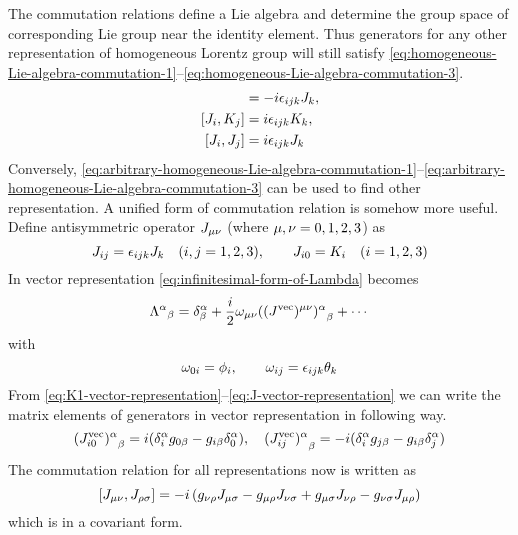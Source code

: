 The commutation relations define a Lie algebra and determine the group space of corresponding Lie group near the identity element. Thus generators for any other representation of homogeneous Lorentz group will still satisfy \eqref{eq:homogeneous-Lie-algebra-commutation-1}--\eqref{eq:homogeneous-Lie-algebra-commutation-3}.
\begin{align}
  [K_i,K_j] &= -i \e_{ijk} J_k, \label{eq:arbitrary-homogeneous-Lie-algebra-commutation-1} \\
  [J_i,K_j] &=  i \e_{ijk} K_k, \label{eq:arbitrary-homogeneous-Lie-algebra-commutation-2} \\
  [J_i,J_j] &=  i \e_{ijk} J_k  \label{eq:arbitrary-homogeneous-Lie-algebra-commutation-3}
\end{align}
Conversely, \eqref{eq:arbitrary-homogeneous-Lie-algebra-commutation-1}--\eqref{eq:arbitrary-homogeneous-Lie-algebra-commutation-3} can be used to find other representation. A unified form of commutation relation is somehow more useful. Define antisymmetric operator $J_{\mu\nu}$ (where $\mu,\nu = 0,1,2,3$) as
\begin{equation} \label{eq:redefine-Lorentz-generator-operators}
  J_{ij} = \epsilon_{ijk}J_k \quad (i,j = 1,2,3), \qquad
  J_{i0} = K_i \quad (i = 1,2,3)
\end{equation}
In vector representation
\eqref{eq:infinitesimal-form-of-Lambda}
becomes 
\begin{equation}\label{expansion of vector representation}
{\Lambda^{\alpha}}_{\beta} = \delta^{\alpha}_{\beta}+ \frac{i}{2}\omega_{\mu\nu}{((J^{\text{vec}})^{\mu\nu})^{\alpha}}_{\beta}+\cdots
\end{equation}
with 
\begin{equation}\label{redefinition of the parameters}
\omega_{0i}=\phi_i, \qquad \omega_{ij}=\epsilon_{ijk}\theta_k
\end{equation}
From \eqref{eq:K1-vector-representation}--\eqref{eq:J-vector-representation}
we can write the matrix elements of generators in vector representation in following way.
\begin{equation}\label{explicit form of vector representation}
{(J^{\text{vec}}_{i0})^{\alpha}}_{\beta}=
i(\delta^{\alpha}_i g_{0\beta}-g_{i\beta}\delta^{\alpha}_0),\quad
{(J^{\text{vec}}_{ij})^{\alpha}}_{\beta}=
-i(\delta^{\alpha}_i g_{j\beta}-g_{i\beta}\delta^{\alpha}_j)
\end{equation} 
The commutation relation for all representations now is written as
\begin{equation} \label{eq:Lorentz-operator-commutation-covariant-form}
  \comm{J_{\mu\nu}}{J_{\rh\s}} =
  -i \, (  g_{\n\rh}J_{\m\s} - g_{\m\rh}J_{\n\s}
        + g_{\m\s}J_{\n\rh} - g_{\n\s}J_{\m\rh})
\end{equation}
which is in a covariant form.

